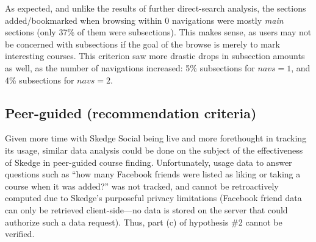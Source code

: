   As expected, and unlike the results of further direct-search analysis, the sections added/bookmarked when browsing within 0 navigations were mostly \emph{main} sections (only 37\% of them were subsections). This makes sense, as users may not be concerned with subsections if the goal of the browse is merely to mark interesting courses. This criterion saw more drastic drops in subsection amounts as well, as the number of navigations increased: 5\% subsections for ${navs}=1$, and 4\% subsections for ${navs}=2$.

\subsection{Peer-guided (recommendation criteria)}

  Given more time with Skedge Social being live and more forethought in tracking its usage, similar data analysis could be done on the subject of the effectiveness of Skedge in peer-guided course finding. Unfortunately, usage data to answer questions such as ``how many Facebook friends were listed as liking or taking a course when it was added?'' was not tracked, and cannot be retroactively computed due to Skedge's purposeful privacy limitations (Facebook friend data can only be retrieved client-side---no data is stored on the server that could authorize such a data request). Thus, part (c) of hypothesis \#2 cannot be verified.